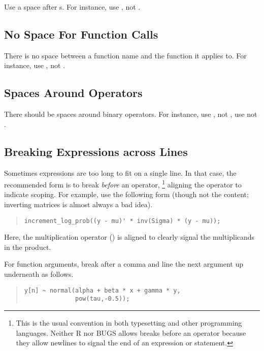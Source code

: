 Use a space after s.  For instance, use , not
.

\subsection{No Space For Function Calls}

There is no space between a function name and the function it applies
to.  For instance, use , not .

\subsection{Spaces Around Operators}

There should be spaces around binary operators.  For instance, use
, not , use  not
.

\subsection{Breaking Expressions across Lines}

Sometimes expressions are too long to fit on a single line.  In that
case, the recommended form is to break \emph{before} an operator,%
%
\footnote{This is the usual convention in both typesetting and other
  programming languages. Neither R nor BUGS allows breaks before an
  operator because they allow newlines to signal the end of an
  expression or statement.}
%
aligning the operator to indicate scoping.  For example, use the
following form (though not the content; inverting matrices is almost
always a bad idea).
%
\begin{quote}
\begin{Verbatim}[fontsize=\small]
increment_log_prob((y - mu)' * inv(Sigma) * (y - mu));
\end{Verbatim}
\end{quote}
%
Here, the multiplication operator (\code{*}) is aligned to clearly
signal the multiplicands in the product.  

For function arguments, break after a comma and line the next
argument up underneath as follows.
%
\begin{quote}
\begin{Verbatim}[fontsize=\small]
y[n] ~ normal(alpha + beta * x + gamma * y,
              pow(tau,-0.5));
\end{Verbatim}
\end{quote}
%

